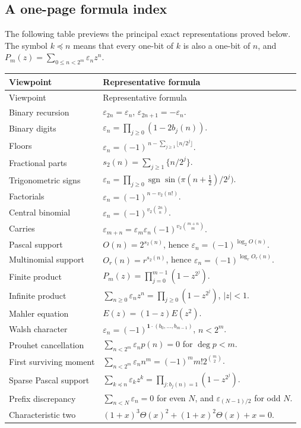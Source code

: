 \documentclass[11pt,oneside]{article}
\theoremstyle{definition}
\theoremstyle{remark}
\newcommand{\swt}{s_2}
\newcommand{\vtwo}{v_2}
\newcommand{\sgn}{\operatorname{sgn}}
\newcommand{\eps}{\varepsilon}
\newcommand{\submask}{\preccurlyeq}
\newcommand{\1}{\mathbf 1}
\begin{document}
\subsection{A one-page formula index}

The following table previews the principal exact representations proved below.  The symbol
\(k\submask n\) means that every one-bit of \(k\) is also a one-bit of \(n\), and
\(P_m(z)=\sum_{0\le n<2^m}\eps_nz^n\).

\renewcommand{\arraystretch}{1.22}
\begin{longtable}{@{}p{}p{}@{}}
\toprule
Viewpoint & Representative formula \\
\midrule
\endfirsthead
\toprule
Viewpoint & Representative formula \\
\midrule
\endhead
Binary recursion & \(\eps_{2n}=\eps_n\), \(\eps_{2n+1}=-\eps_n\). \\
Binary digits & \(\eps_n=\prod_{j\ge0}(1-2b_j(n))\). \\
Floors & \(\eps_n=(-1)^{\,n-\sum_{j\ge1}\lfloor n/2^j\rfloor}\). \\
Fractional parts & \(\swt(n)=\sum_{j\ge1}\{n/2^j\}\). \\
Trigonometric signs & \(\eps_n=\prod_{j\ge0}\sgn\sin\!\bigl(\pi(n+\tfrac12)/2^j\bigr)\). \\
Factorials & \(\eps_n=(-1)^{n-\vtwo(n!)}\). \\
Central binomial & \(\eps_n=(-1)^{\vtwo\binom{2n}{n}}\). \\
Carries & \(\eps_{m+n}=\eps_m\eps_n(-1)^{\vtwo\binom{m+n}{m}}\). \\
Pascal support & \(O(n)=2^{\swt(n)}\), hence \(\eps_n=(-1)^{\log_2O(n)}\). \\
Multinomial support & \(O_r(n)=r^{\swt(n)}\), hence \(\eps_n=(-1)^{\log_rO_r(n)}\). \\
Finite product & \(P_m(z)=\prod_{j=0}^{m-1}(1-z^{2^j})\). \\
Infinite product & \(\sum_{n\ge0}\eps_nz^n=\prod_{j\ge0}(1-z^{2^j})\), \(|z|<1\). \\
Mahler equation & \(E(z)=(1-z)E(z^2)\). \\
Walsh character & \(\eps_n=(-1)^{\mathbf1\cdot(b_0,\ldots,b_{m-1})}\), \(n<2^m\). \\
Prouhet cancellation & \(\sum_{n<2^m}\eps_np(n)=0\) for \(\deg p<m\). \\
First surviving moment & \(\sum_{n<2^m}\eps_nn^m=(-1)^m m!2^{\binom m2}\). \\
Sparse Pascal support & \(\sum_{k\submask n}\eps_kz^k=\prod_{j:b_j(n)=1}(1-z^{2^j})\). \\
Prefix discrepancy & \(\sum_{n<N}\eps_n=0\) for even \(N\), and \(\eps_{(N-1)/2}\) for odd \(N\). \\
Characteristic two & \((1+x)^3\Theta(x)^2+(1+x)^2\Theta(x)+x=0\). \\
\bottomrule
\end{longtable}
\renewcommand{\arraystretch}{1}
\end{document}
